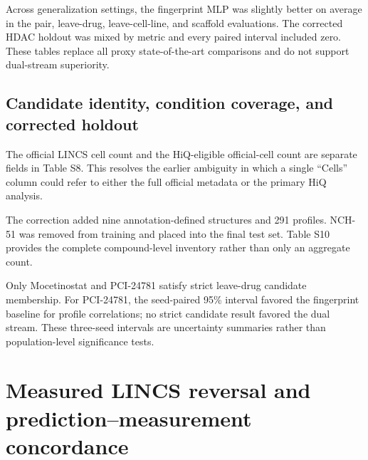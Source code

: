 \documentclass[10pt]{article}
\begin{document}








Across generalization settings, the fingerprint MLP was slightly better on average in the pair, leave-drug, leave-cell-line, and scaffold evaluations. The corrected HDAC holdout was mixed by metric and every paired interval included zero. These tables replace all proxy state-of-the-art comparisons and do not support dual-stream superiority.

\begin{landscape}
\section{Candidate identity, condition coverage, and corrected holdout}




\end{landscape}

The official LINCS cell count and the HiQ-eligible official-cell count are separate fields in Table S8. This resolves the earlier ambiguity in which a single ``Cells'' column could refer to either the full official metadata or the primary HiQ analysis.



The correction added nine annotation-defined structures and 291 profiles. NCH-51 was removed from training and placed into the final test set. Table S10 provides the complete compound-level inventory rather than only an aggregate count.





Only Mocetinostat and PCI-24781 satisfy strict leave-drug candidate membership. For PCI-24781, the seed-paired 95\% interval favored the fingerprint baseline for profile correlations; no strict candidate result favored the dual stream. These three-seed intervals are uncertainty summaries rather than population-level significance tests.

\section{Measured LINCS reversal and prediction--measurement concordance}
\end{document}
